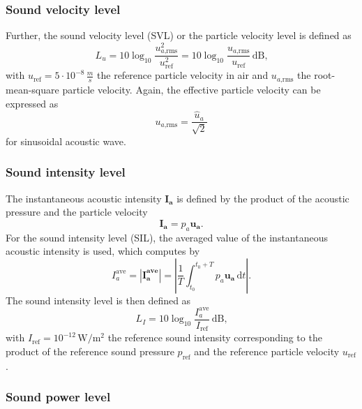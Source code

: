 \subsubsection*{Sound velocity level}
Further, the sound velocity level (SVL) or the particle velocity level is defined as
\begin{equation}
	L_u = 10\log_{10}\frac{u_{a\text{,rms}}^2}{u_\text{ref}^2} = 10\log_{10}\frac{u_{a\text{,rms}}}{u_\text{ref}}\,\text{dB}\text{,} 
\end{equation}
with $u_\text{ref} = 5\cdot10^{-8}\,\frac{m}{s}$ the reference particle velocity in air and $u_{a\text{,rms}}$ the root-mean-square particle velocity. Again, the effective particle velocity can be expressed as
\begin{equation}
	u_{a\text{,rms}} = \frac{\hat{u}_a}{\sqrt{2}}
\end{equation}
for sinusoidal acoustic wave.

\subsubsection*{Sound intensity level}

The instantaneous acoustic intensity $\boldsymbol{I_a}$ is defined by the product of the acoustic pressure and the particle velocity
\begin{equation}
	\boldsymbol{I_a} = p_a \boldsymbol{u_a}\text{.}
\end{equation} 
For the sound intensity level (SIL), the averaged value of the instantaneous acoustic intensity is used, which computes by
\begin{equation}
	I_a^{\text{ave}} = |\boldsymbol{I_a^{\text{ave}}}| = \left|\frac{1}{T}\int_{t_0}^{t_0 + T} p_a \boldsymbol{u_a}\,\text{d}t\right|\text{.}
\end{equation}
The sound intensity level is then defined as
\begin{equation}
	L_I = 10\log_{10}\frac{I_a^{\text{ave}}}{I_\text{ref}}\,\text{dB}\text{,}
\end{equation}
with $I_\text{ref} = 10^{-12}\,\text{W/}\text{m}^2$ the reference sound intensity corresponding to the product of the reference sound pressure $p_\text{ref}$ and the reference particle velocity $u_\text{ref}$.

\subsubsection*{Sound power level}

